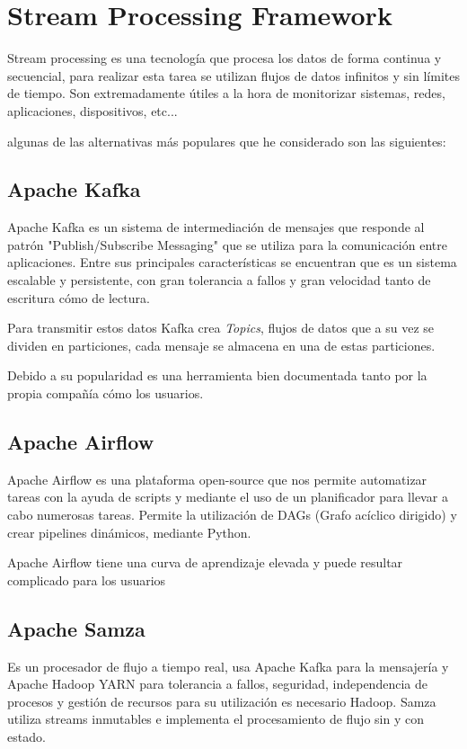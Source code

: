 
\section{Stream Processing Framework}

Stream processing es una tecnología que procesa los datos de forma continua y secuencial, para realizar esta tarea se utilizan flujos de datos infinitos y sin límites de tiempo. Son extremadamente útiles a la hora de monitorizar sistemas, redes, aplicaciones, dispositivos, etc... 

algunas de las alternativas más populares que he considerado son las siguientes:

\subsection{Apache Kafka}

Apache Kafka es un sistema de intermediación de mensajes que responde al patrón "Publish/Subscribe Messaging" que se utiliza para la comunicación entre aplicaciones. Entre sus principales características se encuentran que es un sistema escalable y persistente, con gran tolerancia a fallos y gran velocidad tanto de escritura cómo de lectura.

Para transmitir estos datos Kafka crea \textit{Topics}, flujos de datos que a su vez se dividen en particiones, cada mensaje se almacena en una de estas particiones.

Debido a su popularidad es una herramienta bien documentada \cite{documentacion:kafka} tanto por la propia compañía cómo los usuarios. \cite{pagina:kafka}

\subsection{Apache Airflow}
Apache Airflow es una plataforma open-source que nos permite automatizar tareas con la ayuda de scripts y mediante el uso de un planificador para llevar a cabo numerosas tareas. Permite la utilización de DAGs (Grafo acíclico dirigido) y crear pipelines dinámicos, mediante Python. 

Apache Airflow tiene una curva de aprendizaje elevada y puede resultar complicado para los usuarios\cite{pagina:HEVO}

\subsection{Apache Samza}
Es un procesador de flujo a tiempo real, usa Apache Kafka para la mensajería y Apache Hadoop YARN para tolerancia a fallos, seguridad, independencia de procesos y gestión de recursos para su utilización es necesario Hadoop. Samza utiliza streams inmutables e implementa el procesamiento de flujo sin y con estado. \cite{pagina:Samza}

